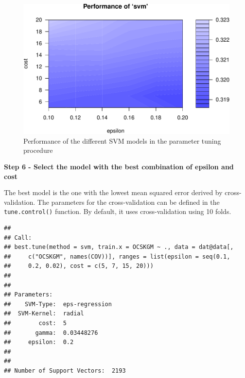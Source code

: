 \documentclass[10pt,b5paper,]{book}
\newenvironment{Shaded}{\begin{snugshade}}{\end{snugshade}}
\newcommand{\CommentTok}[1]{\textcolor[rgb]{0.56,0.35,0.01}{\textit{#1}}}
\newcommand{\KeywordTok}[1]{\textcolor[rgb]{0.13,0.29,0.53}{\textbf{#1}}}
\newcommand{\NormalTok}[1]{#1}
\newcommand{\OperatorTok}[1]{\textcolor[rgb]{0.81,0.36,0.00}{\textbf{#1}}}
\newcommand{\StringTok}[1]{\textcolor[rgb]{0.31,0.60,0.02}{#1}}
\theoremstyle{definition}
\theoremstyle{definition}
\theoremstyle{definition}
\theoremstyle{remark}
\begin{document}
\begin{figure}
\centering
\includegraphics{SOCMapping_files/figure-latex/unnamed-chunk-77-1.pdf}
\caption{\label{fig:unnamed-chunk-77}Performance of the different SVM models
in the parameter tuning procedure}
\end{figure}

\textbf{Step 6 - Select the model with the best combination of epsilon
and cost}

The best model is the one with the lowest mean squared error derived by
cross-validation. The parameters for the cross-validation can be defined
in the \texttt{tune.control()} function. By default, it uses
cross-validation using 10 folds.

\begin{Shaded}
\end{Shaded}

\begin{verbatim}
## 
## Call:
## best.tune(method = svm, train.x = OCSKGM ~ ., data = dat@data[, 
##     c("OCSKGM", names(COV))], ranges = list(epsilon = seq(0.1, 
##     0.2, 0.02), cost = c(5, 7, 15, 20)))
## 
## 
## Parameters:
##    SVM-Type:  eps-regression 
##  SVM-Kernel:  radial 
##        cost:  5 
##       gamma:  0.03448276 
##     epsilon:  0.2 
## 
## 
## Number of Support Vectors:  2193
\end{verbatim}
\end{document}
